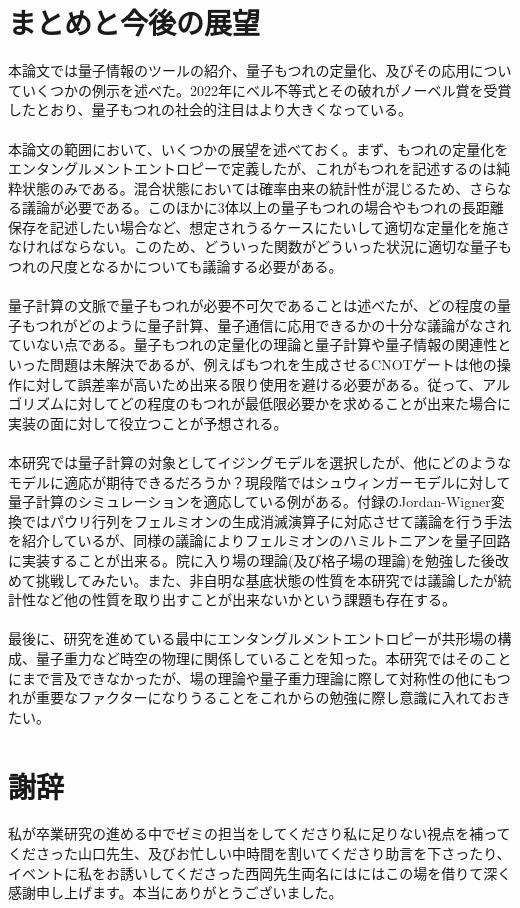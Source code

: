 \documentclass[a4paper,10.5pt]{article}
\numberwithin{equation}{section}
\begin{document}
\section{まとめと今後の展望}
本論文では量子情報のツールの紹介、量子もつれの定量化、及びその応用についていくつかの例示を述べた。2022年にベル不等式とその破れがノーベル賞を受賞したとおり、量子もつれの社会的注目はより大きくなっている。\\
\\
本論文の範囲において、いくつかの展望を述べておく。まず、もつれの定量化をエンタングルメントエントロピーで定義したが、これがもつれを記述するのは純粋状態のみである。混合状態においては確率由来の統計性が混じるため、さらなる議論が必要である。このほかに3体以上の量子もつれの場合やもつれの長距離保存を記述したい場合など、想定されうるケースにたいして適切な定量化を施さなければならない。このため、どういった関数がどういった状況に適切な量子もつれの尺度となるかについても議論する必要がある。\\
\\
量子計算の文脈で量子もつれが必要不可欠であることは述べたが、どの程度の量子もつれがどのように量子計算、量子通信に応用できるかの十分な議論がなされていない点である。量子もつれの定量化の理論と量子計算や量子情報の関連性といった問題は未解決であるが、例えばもつれを生成させるCNOTゲートは他の操作に対して誤差率が高いため出来る限り使用を避ける必要がある。従って、アルゴリズムに対してどの程度のもつれが最低限必要かを求めることが出来た場合に実装の面に対して役立つことが予想される。\\
\\
本研究では量子計算の対象としてイジングモデルを選択したが、他にどのようなモデルに適応が期待できるだろうか？現段階ではシュウィンガーモデルに対して量子計算のシミュレーションを適応している例がある。付録のJordan-Wigner変換ではパウリ行列をフェルミオンの生成消滅演算子に対応させて議論を行う手法を紹介しているが、同様の議論によりフェルミオンのハミルトニアンを量子回路に実装することが出来る。院に入り場の理論(及び格子場の理論)を勉強した後改めて挑戦してみたい。また、非自明な基底状態の性質を本研究では議論したが統計性など他の性質を取り出すことが出来ないかという課題も存在する。\\
\\
最後に、研究を進めている最中にエンタングルメントエントロピーが共形場の構成、量子重力など時空の物理に関係していることを知った。本研究ではそのことにまで言及できなかったが、場の理論や量子重力理論に際して対称性の他にもつれが重要なファクターになりうることをこれからの勉強に際し意識に入れておきたい。

\section*{謝辞}
私が卒業研究の進める中でゼミの担当をしてくださり私に足りない視点を補ってくださった山口先生、及びお忙しい中時間を割いてくださり助言を下さったり、イベントに私をお誘いしてくださった西岡先生両名にはにはこの場を借りて深く感謝申し上げます。本当にありがとうございました。
\end{document}
